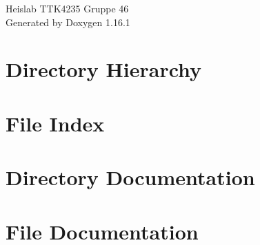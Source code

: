 \documentclass[twoside]{book}
\newcommand{\+}{\discretionary{\mbox{\scriptsize$\hookleftarrow$}}{}{}}
\newcommand{\clearemptydoublepage}{%
    \newpage{\pagestyle{empty}\cleardoublepage}%
  }
\begin{document}
  \raggedbottom
    \hypersetup{pageanchor=false,
                bookmarksnumbered=true,
                pdfencoding=unicode
               }
  \begin{titlepage}
  \vspace*{7cm}
  \begin{center}%
  {\Large Heislab TTK4235 Gruppe 46}\\
  \vspace*{1cm}
  {\large Generated by Doxygen 1.16.1}\\
  \end{center}
  \end{titlepage}
  \clearemptydoublepage
  \tableofcontents
  \clearemptydoublepage
  \hypersetup{pageanchor=true}
\chapter{Directory Hierarchy}

\chapter{File Index}

\chapter{Directory Documentation}

\chapter{File Documentation}






















  \backmatter
  \newpage
  \clearemptydoublepage
  \printindex
\end{document}
